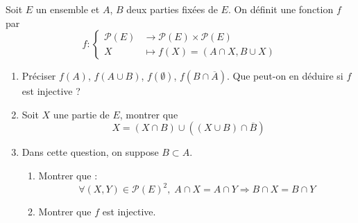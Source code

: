 Soit $E$ un ensemble et $A$, $B$ deux parties fixées de $E$. On définit une fonction $f$ par 
\begin{displaymath}
  f:
\left\lbrace 
\begin{aligned}
  \mathcal{P}(E) &\rightarrow \mathcal{P}(E)\times \mathcal{P}(E) \\
  X &\mapsto f(X) = (A\cap X, B \cup X)
\end{aligned}
\right. 
\end{displaymath}
\begin{enumerate}
  \item Préciser $f(A)$, $f(A\cup B)$, $f(\emptyset)$, $f(B\cap \overline{A})$. Que peut-on en déduire si $f$ est injective ?
  \item Soit $X$ une partie de $E$, montrer que 
\begin{displaymath}
X = (X \cap B) \cup \left( (X\cup B) \cap \overline{B}\right)   
\end{displaymath}

  \item Dans cette question, on suppose $B \subset A$.
\begin{enumerate}
  \item Montrer que :
\begin{displaymath}
\forall (X,Y)\in \mathcal{P}(E)^2, \; A \cap X = A \cap Y \Rightarrow B \cap X = B \cap Y
\end{displaymath}
  \item Montrer que $f$ est injective.
\end{enumerate}

\end{enumerate}
